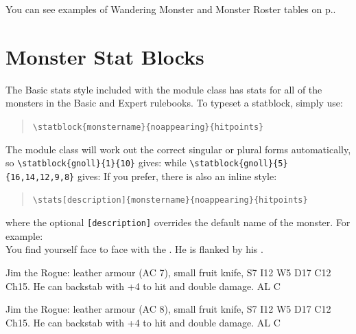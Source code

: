 \documentclass[letterpaper,serif]{module}
\begin{document}
You can see examples of Wandering Monster and Monster Roster tables on p.\pageref{wanderingmonsters}.

\section{Monster Stat Blocks}
\label{stat_blocks}

The Basic stats style included with the module class has stats for all of the monsters in the Basic and Expert rulebooks.
To typeset a statblock, simply use:
\begin{quote}
\verb|\statblock{monstername}{noappearing}{hitpoints}|
\end{quote}
The module class will work out the correct singular or plural forms automatically, so
\verb|\statblock{gnoll}{1}{10}| gives:
while \verb|\statblock{gnoll}{5}{16,14,12,9,8}| gives:
If you prefer, there is also an inline style:
\begin{quote}
\hspace{-2em}\verb|\stats[description]{monstername}{noappearing}{hitpoints}|
\end{quote}
where the optional \verb|[description]| overrides the default name of the monster.
For example:\\[0.15em]

\noindent You find yourself face to face with the . He is flanked
by his .


\begin{statblockfreestyle}
\begin{ifbasicstats}
Jim the Rogue: leather armour (AC 7), small fruit knife, S7 I12 W5 D17 C12 Ch15. He can backstab with +4 to hit and double damage. AL C
\end{ifbasicstats}
\begin{ifadvancedstats}
Jim the Rogue: leather armour (AC 8), small fruit knife, S7 I12 W5 D17 C12 Ch15. He can backstab with +4 to hit and double damage. AL C
\end{ifadvancedstats}
\end{statblockfreestyle}



\end{document}
